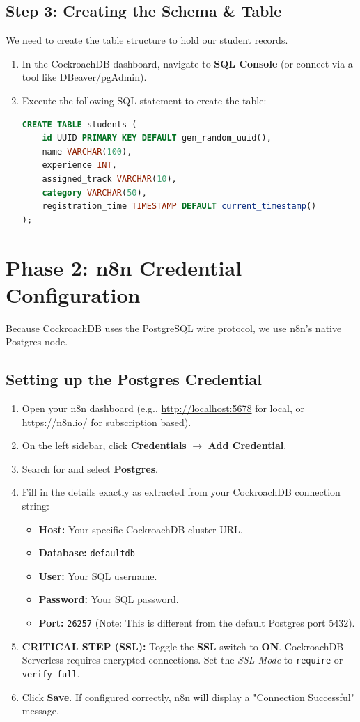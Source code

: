 \documentclass[12pt,a4paper]{article}
\begin{document}
\subsection{Step 3: Creating the Schema \& Table}
We need to create the table structure to hold our student records.
\begin{enumerate}
    \item In the CockroachDB dashboard, navigate to \textbf{SQL Console} (or connect via a tool like DBeaver/pgAdmin).
    \item Execute the following SQL statement to create the table:
\begin{lstlisting}[language=SQL]
CREATE TABLE students (
    id UUID PRIMARY KEY DEFAULT gen_random_uuid(),
    name VARCHAR(100),
    experience INT,
    assigned_track VARCHAR(10),
    category VARCHAR(50),
    registration_time TIMESTAMP DEFAULT current_timestamp()
);
\end{lstlisting}
\end{enumerate}

\section{Phase 2: n8n Credential Configuration}
Because CockroachDB uses the PostgreSQL wire protocol, we use n8n's native Postgres node.

\subsection{Setting up the Postgres Credential}
\begin{enumerate}
    \item Open your n8n dashboard (e.g., \url{http://localhost:5678} for local, or \url{https://n8n.io/} for subscription based).
    \item On the left sidebar, click \textbf{Credentials} $\rightarrow$ \textbf{Add Credential}.
    \item Search for and select \textbf{Postgres}.
    \item Fill in the details exactly as extracted from your CockroachDB connection string:
    \begin{itemize}
        \item \textbf{Host:} Your specific CockroachDB cluster URL.
        \item \textbf{Database:} \texttt{defaultdb}
        \item \textbf{User:} Your SQL username.
        \item \textbf{Password:} Your SQL password.
        \item \textbf{Port:} \texttt{26257} (Note: This is different from the default Postgres port 5432).
    \end{itemize}
    \item \textbf{CRITICAL STEP (SSL):} Toggle the \textbf{SSL} switch to \textbf{ON}. CockroachDB Serverless requires encrypted connections. Set the \textit{SSL Mode} to \texttt{require} or \texttt{verify-full}.
    \item Click \textbf{Save}. If configured correctly, n8n will display a "Connection Successful" message.
\end{enumerate}
\end{document}
